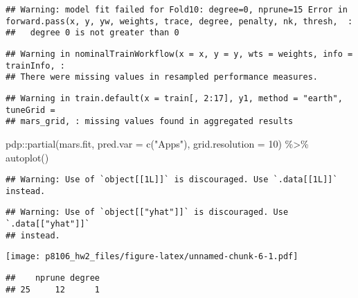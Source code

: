 \documentclass[
]{article}
\newenvironment{Shaded}{\begin{snugshade}}{\end{snugshade}}
\newcommand{\AttributeTok}[1]{\textcolor[rgb]{0.77,0.63,0.00}{#1}}
\newcommand{\DecValTok}[1]{\textcolor[rgb]{0.00,0.00,0.81}{#1}}
\newcommand{\FunctionTok}[1]{\textcolor[rgb]{0.00,0.00,0.00}{#1}}
\newcommand{\NormalTok}[1]{#1}
\newcommand{\SpecialCharTok}[1]{\textcolor[rgb]{0.00,0.00,0.00}{#1}}
\newcommand{\StringTok}[1]{\textcolor[rgb]{0.31,0.60,0.02}{#1}}
\begin{document}
\begin{verbatim}
## Warning: model fit failed for Fold10: degree=0, nprune=15 Error in forward.pass(x, y, yw, weights, trace, degree, penalty, nk, thresh,  : 
##   degree 0 is not greater than 0
\end{verbatim}

\begin{verbatim}
## Warning in nominalTrainWorkflow(x = x, y = y, wts = weights, info = trainInfo, :
## There were missing values in resampled performance measures.
\end{verbatim}

\begin{verbatim}
## Warning in train.default(x = train[, 2:17], y1, method = "earth", tuneGrid =
## mars_grid, : missing values found in aggregated results
\end{verbatim}

\begin{Shaded}
\begin{Highlighting}[]
\NormalTok{pdp}\SpecialCharTok{::}\FunctionTok{partial}\NormalTok{(mars.fit, }\AttributeTok{pred.var =} \FunctionTok{c}\NormalTok{(}\StringTok{"Apps"}\NormalTok{), }\AttributeTok{grid.resolution =} \DecValTok{10}\NormalTok{) }\SpecialCharTok{\%\textgreater{}\%}
  \FunctionTok{autoplot}\NormalTok{()}
\end{Highlighting}
\end{Shaded}

\begin{verbatim}
## Warning: Use of `object[[1L]]` is discouraged. Use `.data[[1L]]` instead.
\end{verbatim}

\begin{verbatim}
## Warning: Use of `object[["yhat"]]` is discouraged. Use `.data[["yhat"]]`
## instead.
\end{verbatim}

\texttt{[image: p8106\_hw2\_files/figure-latex/unnamed-chunk-6-1.pdf]}

\begin{Shaded}
\end{Shaded}

\begin{verbatim}
##    nprune degree
## 25     12      1
\end{verbatim}
\end{document}
